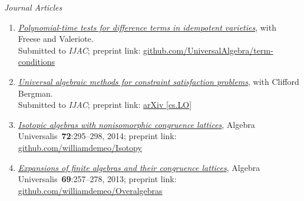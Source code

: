 \newcommand\mmskip{-6mm}

    {\it Journal Articles}%
    \begin{enumerate}
    \item \href{https://github.com/UniversalAlgebra/term-conditions/tree/master/ijac}{{\it Polynomial-time tests for difference terms in idempotent varieties}},
      with Freese and Valeriote.\\
      Submitted to {\small {\it IJAC}}; preprint link: \href{https://github.com/UniversalAlgebra/term-conditions/tree/master/DiffTerm}{github.com/UniversalAlgebra/term-conditions}

    \item \href{https://goo.gl/nXC1i9} %
         {{\it Universal algebraic methods for constraint satisfaction problems}},
         with Clifford Bergman.\\
         Submitted to {\small {\it IJAC}};
         preprint link: \href{https://arxiv.org/abs/1611.02867}{arXiv [cs.LO]}

    \item \href{https://github.com/williamdemeo/Isotopy}{{\it Isotopic algebras with nonisomorphic congruence lattices}},
    Algebra Universalis~{\bf 72}:295--298, 2014; 
         preprint link: \href{https://github.com/williamdemeo/Isotopy}{github.com/williamdemeo/Isotopy}

    \item \href{https://github.com/williamdemeo/Overalgebras}{{\it Expansions of finite algebras and their congruence lattices}},
    Algebra Universalis~{\bf 69}:257--278, 2013; preprint link: \href{https://github.com/williamdemeo/Overalgebras}{github.com/williamdemeo/Overalgebras}
    \end{enumerate}


